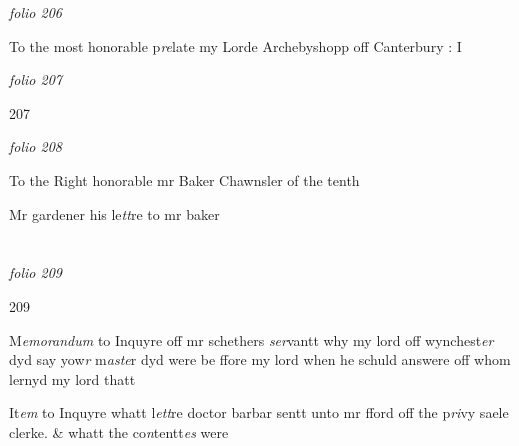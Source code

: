 \documentclass[12pt, a4paper]{book}
\begin{document}
\textit{folio 206}


 	
		\ifthenelse{\isodd{\thepage}}
		{\reversemarginpar}
		{\normalmarginpar}
		To the most honorable
	p\textit{re}late my Lorde Archebyshopp
off Canterbury : I

\dotfill
						\newpage
{}

\textit{folio 207}


\begin{flushright}{\color{Mahogany}207}\end{flushright}

\dotfill
						\newpage
{}

\textit{folio 208}



		\ifthenelse{\isodd{\thepage}}
		{\reversemarginpar}
		{\normalmarginpar}
		To the Right honorable
mr Baker Chawnsler
of the tenth


		\ifthenelse{\isodd{\thepage}}
		{\reversemarginpar}
		{\normalmarginpar}
		Mr gardener
 his le\textit{tt}re 
 	to mr baker
			

\dotfill
						\newpage {} \section*{}  \subsection*{}

\textit{folio 209}



\begin{flushright}{\color{Mahogany}209}\end{flushright}
            		
		\ifthenelse{\isodd{\thepage}}
		{\reversemarginpar}
		{\normalmarginpar}
		M\textit{emorandum} to Inquyre off mr schethers \textit{ser}vantt why my lord
 off wynchest\textit{er} dyd say yow\textit{r} m\textit{aste}r dyd were be ffore my
lord when he schuld answere off whom lernyd
my lord thatt

		\ifthenelse{\isodd{\thepage}}
		{\reversemarginpar}
		{\normalmarginpar}
		It\textit{em} to Inquyre whatt l\textit{ett}re doctor barbar sentt
unto mr fford off the p\textit{ri}vy saele clerke. \& whatt 
	the co\textit{n}tentt\textit{es} were
\end{document}
